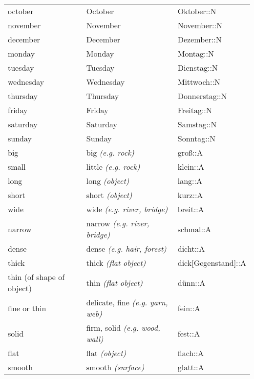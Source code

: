\begin{center}
\begin{longtable}{lll}
{\sc \lowercase{	OCTOBER	}}	&	October		&	Oktober::N	\\
{\sc \lowercase{	NOVEMBER	}}	&	November		&	November::N	\\
{\sc \lowercase{	DECEMBER	}}	&	December		&	Dezember::N	\\
{\sc \lowercase{	MONDAY	}}	&	Monday		&	Montag::N	\\
{\sc \lowercase{	TUESDAY	}}	&	Tuesday		&	Dienstag::N	\\
{\sc \lowercase{	WEDNESDAY	}}	&	Wednesday		&	Mittwoch::N	\\
{\sc \lowercase{	THURSDAY	}}	&	Thursday		&	Donnerstag::N	\\
{\sc \lowercase{	FRIDAY	}}	&	Friday		&	Freitag::N	\\
{\sc \lowercase{	SATURDAY	}}	&	Saturday		&	Samstag::N	\\
{\sc \lowercase{	SUNDAY	}}	&	Sunday		&	Sonntag::N	\\
{\sc \lowercase{	BIG	}}	&	big	\textit{\footnotesize (e.g. rock)}	&	groß::A	\\
{\sc \lowercase{	SMALL	}}	&	little	\textit{\footnotesize (e.g. rock)}	&	klein::A	\\
{\sc \lowercase{	LONG	}}	&	long	\textit{\footnotesize (object)}	&	lang::A	\\
{\sc \lowercase{	SHORT	}}	&	short	\textit{\footnotesize (object)}	&	kurz::A	\\
{\sc \lowercase{	WIDE	}}	&	wide	\textit{\footnotesize (e.g. river, bridge)}	&	breit::A	\\
{\sc \lowercase{	NARROW	}}	&	narrow	\textit{\footnotesize (e.g. river, bridge)}	&	schmal::A	\\
{\sc \lowercase{	DENSE	}}	&	dense	\textit{\footnotesize (e.g. hair, forest)}	&	dicht::A	\\
{\sc \lowercase{	THICK	}}	&	thick	\textit{\footnotesize (flat object)}	&	dick[Gegenstand]::A	\\
{\sc \lowercase{	THIN \footnotesize (OF SHAPE OF OBJECT)	}}	&	thin	\textit{\footnotesize (flat object)}	&	dünn::A	\\
{\sc \lowercase{	FINE OR THIN	}}	&	delicate, fine	\textit{\footnotesize (e.g. yarn, web)}	&	fein::A	\\
{\sc \lowercase{	SOLID	}}	&	firm, solid	\textit{\footnotesize (e.g. wood, wall)}	&	fest::A	\\
{\sc \lowercase{	FLAT	}}	&	flat	\textit{\footnotesize (object)}	&	flach::A	\\
{\sc \lowercase{	SMOOTH	}}	&	smooth	\textit{\footnotesize (surface)}	&	glatt::A	\\

\end{longtable}
\end{center}
